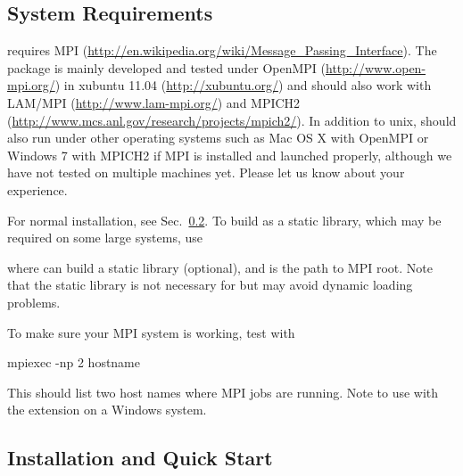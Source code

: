 \subsection[System Requirements]{System Requirements}
\label{sec:system_requirements}

 requires MPI
(\url{http://en.wikipedia.org/wiki/Message_Passing_Interface}). The
package is mainly developed and tested under {\color{blue} OpenMPI}
(\url{http://www.open-mpi.org/}) in xubuntu 11.04
(\url{http://xubuntu.org/}) and should also work with LAM/MPI
(\url{http://www.lam-mpi.org/}) and MPICH2
(\url{http://www.mcs.anl.gov/research/projects/mpich2/}).  In addition
to unix,  should also run under other operating systems
such as Mac OS X with OpenMPI or Windows 7 with MPICH2 if MPI is
installed and launched properly, although we have not tested on
multiple machines yet.  Please let us know about your experience.

For normal installation, see Sec.~\ref{sec:installation}. To build as
a static library, which may be required on some large systems, use
where {\color{red} \code{-}} can build a static
library (optional), and  is the path to MPI root.
Note that the static library is not necessary for  but may
avoid dynamic loading problems.

To make sure your MPI system is working, test with
\begin{Command}
mpiexec -np 2 hostname
\end{Command}
This should list two host names where MPI jobs are running.  Note to
use  with the extension on a Windows system.


\subsection[Installation and Quick Start]{Installation and Quick Start}
\label{sec:installation}

